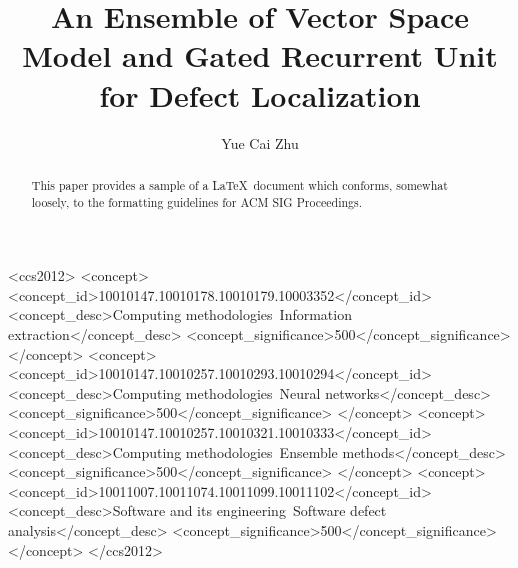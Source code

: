 \documentclass[sigconf]{acmart}
\begin{document}
\title{An Ensemble of Vector Space Model and Gated Recurrent Unit for Defect Localization}


\author{Yue Cai Zhu	}




\begin{abstract}
This paper provides a sample of a \LaTeX\ document which conforms,
somewhat loosely, to the formatting guidelines for
ACM SIG Proceedings.

\end{abstract}


%
%
\begin{CCSXML}
	<ccs2012>
	    <concept>
         	<concept_id>10010147.10010178.10010179.10003352</concept_id>
        	<concept_desc>Computing methodologies~Information extraction</concept_desc>
        	<concept_significance>500</concept_significance>
     	</concept>
    	<concept>
	        <concept_id>10010147.10010257.10010293.10010294</concept_id>
	        <concept_desc>Computing methodologies~Neural networks</concept_desc>
	        <concept_significance>500</concept_significance>
	    </concept>
	    <concept>
	        <concept_id>10010147.10010257.10010321.10010333</concept_id>
	        <concept_desc>Computing methodologies~Ensemble methods</concept_desc>
	        <concept_significance>500</concept_significance>
	    </concept>
	<concept>
	<concept_id>10011007.10011074.10011099.10011102</concept_id>
	<concept_desc>Software and its engineering~Software defect analysis</concept_desc>
	<concept_significance>500</concept_significance>
	</concept>
	</ccs2012>
\end{CCSXML}





\maketitle





\end{document}
